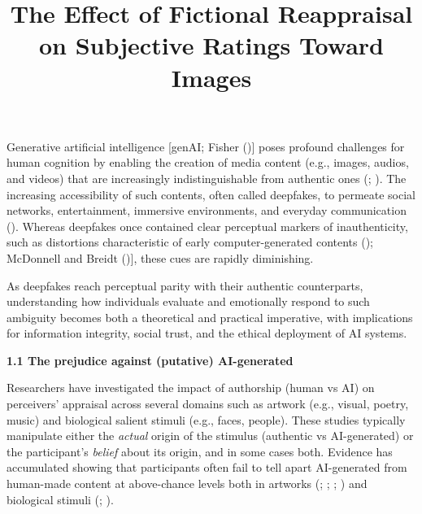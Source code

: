 \documentclass[
  jou,
  floatsintext,
  longtable,
  nolmodern,
  notxfonts,
  notimes,
  colorlinks=true,linkcolor=blue,citecolor=blue,urlcolor=blue]{apa7}
\title{The Effect of Fictional Reappraisal on Subjective Ratings Toward
Images}
\begin{document}
\maketitle




\setlength\LTleft{0pt}

\resetlinenumber[1]


\ifdefined\Shaded\renewenvironment{Shaded}{\begin{snugshade}\begin{singlespace}}{\end{singlespace}\end{snugshade}}\fi


Generative artificial intelligence {[}genAI; Fisher
(){]} poses profound challenges
for human cognition by enabling the creation of media content (e.g.,
images, audios, and videos) that are increasingly indistinguishable from
authentic ones (;
). The increasing accessibility of such contents, often called
deepfakes, to permeate social networks, entertainment, immersive
environments, and everyday communication
(). Whereas
deepfakes once contained clear perceptual markers of inauthenticity,
such as distortions characteristic of early computer-generated contents
(); McDonnell and Breidt
(){]}, these cues are rapidly
diminishing.

As deepfakes reach perceptual parity with their authentic counterparts,
understanding how individuals evaluate and emotionally respond to such
ambiguity becomes both a theoretical and practical imperative, with
implications for information integrity, social trust, and the ethical
deployment of AI systems.

\textbf{1.1 The prejudice against (putative) AI-generated}

Researchers have investigated the impact of authorship (human vs AI) on
perceivers' appraisal across several domains such as artwork (e.g.,
visual, poetry, music) and biological salient stimuli (e.g., faces,
people). These studies typically manipulate either the \emph{actual}
origin of the stimulus (authentic vs AI-generated) or the participant's
\emph{belief} about its origin, and in some cases both. Evidence has
accumulated showing that participants often fail to tell apart
AI-generated from human-made content at above-chance levels both in
artworks (;
;
;
) and
biological stimuli (;
).
\end{document}

